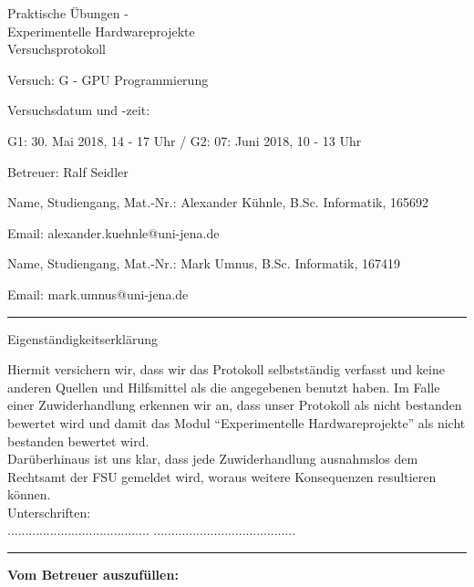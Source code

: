 \documentclass[12pt,a4paper]{scrartcl}
\begin{document}
\thispagestyle{empty}

\begin{center}
  \LARGE
  Praktische \"Ubungen - \\
  Experimentelle Hardwareprojekte \\
  \bigskip
  \Large 
  Versuchsprotokoll
\end{center}

\vspace{1em}
Versuch: G - GPU Programmierung

Versuchsdatum und -zeit:

G1: 30. Mai 2018, 14 - 17 Uhr / G2: 07: Juni 2018, 10 - 13 Uhr 

Betreuer: Ralf Seidler

\vspace{1em}
Name, Studiengang, Mat.-Nr.: Alexander K\"uhnle, B.Sc. Informatik, 165692

Email: alexander.kuehnle@uni-jena.de

\vspace{1em}
Name, Studiengang, Mat.-Nr.: Mark Umnus, B.Sc. Informatik, 167419

Email: mark.umnus@uni-jena.de

\vspace*{1cm}
\hrule
\vspace*{1cm}
{\Large  Eigenst\"andigkeitserkl\"arung }
 
Hiermit versichern wir, dass wir das Protokoll selbstst\"andig verfasst
und keine anderen Quellen und Hilfsmittel als die angegebenen benutzt 
haben. Im Falle einer Zuwiderhandlung erkennen wir an, dass unser Protokoll 
als nicht bestanden bewertet wird und damit das Modul ``Experimentelle 
Hardwareprojekte'' als nicht bestanden bewertet wird. \\
Dar\"uberhinaus ist uns klar, dass jede Zuwiderhandlung ausnahmslos dem 
Rechtsamt der FSU gemeldet wird, woraus weitere Konsequenzen resultieren 
k\"onnen. \\

Unterschriften: \\ 
\hspace*{4cm} ........................................ 
\hspace{2cm} ........................................  \\

\hrule

\vspace*{0.3cm}
\textbf{Vom Betreuer auszuf\"ullen:}
\end{document}
